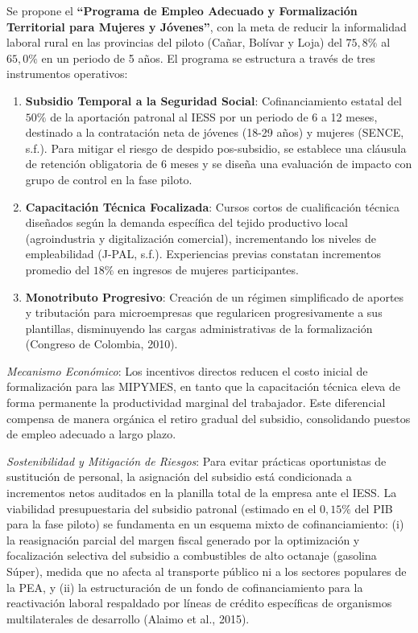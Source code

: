 \documentclass[10pt,]{article}
\providecommand{\tightlist}{%
  \setlength{\itemsep}{0pt}\setlength{\parskip}{0pt}}
\begin{document}
Se propone el \textbf{``Programa de Empleo Adecuado y Formalización
Territorial para Mujeres y Jóvenes''}, con la meta de reducir la
informalidad laboral rural en las provincias del piloto (Cañar, Bolívar
y Loja) del \(75,8\%\) al \(65,0\%\) en un periodo de 5 años. El
programa se estructura a través de tres instrumentos operativos:

\begin{enumerate}
\def\labelenumi{\arabic{enumi}.}
\tightlist
\item
  \textbf{Subsidio Temporal a la Seguridad Social}: Cofinanciamiento
  estatal del \(50\%\) de la aportación patronal al IESS por un periodo
  de 6 a 12 meses, destinado a la contratación neta de jóvenes (18-29
  años) y mujeres (SENCE, s.f.). Para mitigar el riesgo de despido
  pos-subsidio, se establece una cláusula de retención obligatoria de 6
  meses y se diseña una evaluación de impacto con grupo de control en la
  fase piloto.
\item
  \textbf{Capacitación Técnica Focalizada}: Cursos cortos de
  cualificación técnica diseñados según la demanda específica del tejido
  productivo local (agroindustria y digitalización comercial),
  incrementando los niveles de empleabilidad (J-PAL, s.f.). Experiencias
  previas constatan incrementos promedio del \(18\%\) en ingresos de
  mujeres participantes.
\item
  \textbf{Monotributo Progresivo}: Creación de un régimen simplificado
  de aportes y tributación para microempresas que regularicen
  progresivamente a sus plantillas, disminuyendo las cargas
  administrativas de la formalización (Congreso de Colombia, 2010).
\end{enumerate}

\emph{Mecanismo Económico}: Los incentivos directos reducen el costo
inicial de formalización para las MIPYMES, en tanto que la capacitación
técnica eleva de forma permanente la productividad marginal del
trabajador. Este diferencial compensa de manera orgánica el retiro
gradual del subsidio, consolidando puestos de empleo adecuado a largo
plazo.

\emph{Sostenibilidad y Mitigación de Riesgos}: Para evitar prácticas
oportunistas de sustitución de personal, la asignación del subsidio está
condicionada a incrementos netos auditados en la planilla total de la
empresa ante el IESS. La viabilidad presupuestaria del subsidio patronal
(estimado en el \(0,15\%\) del PIB para la fase piloto) se fundamenta en
un esquema mixto de cofinanciamiento: (i) la reasignación parcial del
margen fiscal generado por la optimización y focalización selectiva del
subsidio a combustibles de alto octanaje (gasolina Súper), medida que no
afecta al transporte público ni a los sectores populares de la PEA, y
(ii) la estructuración de un fondo de cofinanciamiento para la
reactivación laboral respaldado por líneas de crédito específicas de
organismos multilaterales de desarrollo (Alaimo et al., 2015).
\end{document}
